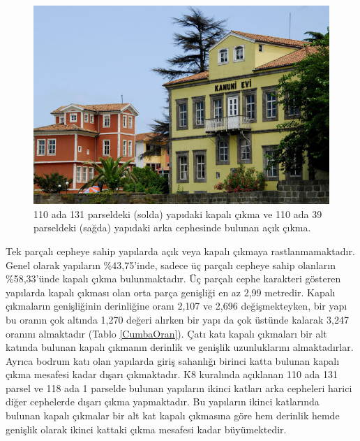 \documentclass[12pt,turkish,a4paperpaper,]{report}
\begin{document}
\newpage

\begin{figure}
\centering
\includegraphics[width=1\textwidth,height=\textheight]{source/figures/110-39.jpg}
\caption{110 ada 131 parseldeki (solda) yapıdaki kapalı çıkma ve 110 ada
39 parseldeki (sağda) yapıdaki arka cephesinde bulunan açık çıkma.
\label{11039}}
\end{figure}

Tek parçalı cepheye sahip yapılarda açık veya kapalı çıkmaya
rastlanmamaktadır. Genel olarak yapıların \%43,75'inde, sadece üç
parçalı cepheye sahip olanların \%58,33'ünde kapalı çıkma bulunmaktadır.
Üç parçalı cephe karakteri gösteren yapılarda kapalı çıkması olan orta
parça genişliği en az 2,99 metredir. Kapalı çıkmaların genişliğinin
derinliğine oranı 2,107 ve 2,696 değişmekteyken, bir yapı bu oranın çok
altında 1,270 değeri alırken bir yapı da çok üstünde kalarak 3,247
oranını almaktadır (Tablo \ref{CumbaOran}). Çatı katı kapalı çıkmaları
bir alt katında bulunan kapalı çıkmanın derinlik ve genişlik
uzunluklarını almaktadırlar. Ayrıca bodrum katı olan yapılarda giriş
sahanlığı birinci katta bulunan kapalı çıkma mesafesi kadar dışarı
çıkmaktadır. K8 kuralında açıklanan 110 ada 131 parsel ve 118 ada 1
parselde bulunan yapıların ikinci katları arka cepheleri harici diğer
cephelerde dışarı çıkma yapmaktadır. Bu yapıların ikinci katlarında
bulunan kapalı çıkmalar bir alt kat kapalı çıkmasına göre hem derinlik
hemde genişlik olarak ikinci kattaki çıkma mesafesi kadar büyümektedir.
\end{document}
